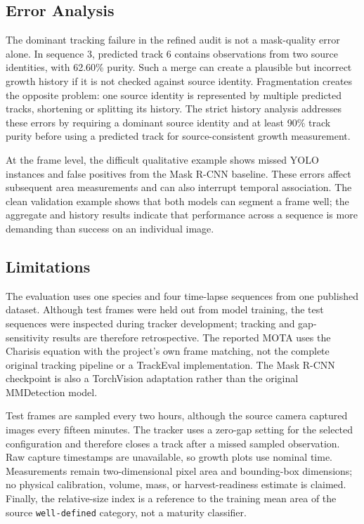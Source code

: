 \documentclass[11pt,a4paper]{article}
\begin{document}
\subsection{Error Analysis}

The dominant tracking failure in the refined audit is not a mask-quality error alone. In sequence 3, predicted track 6 contains observations from two source identities, with 62.60\% purity. Such a merge can create a plausible but incorrect growth history if it is not checked against source identity. Fragmentation creates the opposite problem: one source identity is represented by multiple predicted tracks, shortening or splitting its history. The strict history analysis addresses these errors by requiring a dominant source identity and at least 90\% track purity before using a predicted track for source-consistent growth measurement.

At the frame level, the difficult qualitative example shows missed YOLO instances and false positives from the Mask R-CNN baseline. These errors affect subsequent area measurements and can also interrupt temporal association. The clean validation example shows that both models can segment a frame well; the aggregate and history results indicate that performance across a sequence is more demanding than success on an individual image.

\subsection{Limitations}

The evaluation uses one species and four time-lapse sequences from one published dataset. Although test frames were held out from model training, the test sequences were inspected during tracker development; tracking and gap-sensitivity results are therefore retrospective. The reported MOTA uses the Charisis equation with the project's own frame matching, not the complete original tracking pipeline or a TrackEval implementation. The Mask R-CNN checkpoint is also a TorchVision adaptation rather than the original MMDetection model.

Test frames are sampled every two hours, although the source camera captured images every fifteen minutes. The tracker uses a zero-gap setting for the selected configuration and therefore closes a track after a missed sampled observation. Raw capture timestamps are unavailable, so growth plots use nominal time. Measurements remain two-dimensional pixel area and bounding-box dimensions; no physical calibration, volume, mass, or harvest-readiness estimate is claimed. Finally, the relative-size index is a reference to the training mean area of the source \texttt{well-defined} category, not a maturity classifier.
\end{document}
